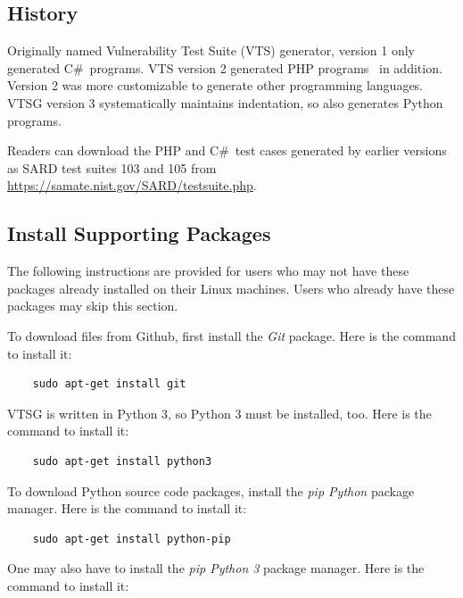 \documentclass[12pt]{article}
\newcommand{\CSharp}{C{\fontseries{b}\selectfont\#}}
\begin{document}
\subsection{History} 

Originally named Vulnerability Test Suite (VTS) generator, version 1 only
generated \CSharp\ programs. VTS version 2 generated PHP
programs~\cite{StivaletFongVTSPHP2016} in addition.  Version 2 was more
customizable to generate other programming languages.
VTSG version 3 systematically maintains indentation, so also
generates Python programs.

Readers can download the PHP and \CSharp\ test cases generated 
by earlier versions as SARD test suites 103 and 105 from
\href{https://samate.nist.gov/SARD/testsuite.php}{https://samate.nist.gov/SARD/testsuite.php}.


\subsection{Install Supporting Packages}

\noindent The following instructions are provided for users who may not have these
packages already installed on their Linux machines. Users who already have these
packages may skip this section.

\noindent To download files from Github, first install the \emph{Git} package.
Here is the command to install it:

\begin{verbatim}
    sudo apt-get install git    
\end{verbatim}

\noindent VTSG is written in Python 3, so Python 3 must be installed, too.
Here is the command to install it:

\begin{verbatim}
    sudo apt-get install python3
\end{verbatim}

\noindent To download Python source code packages, install the \emph{pip
Python} package manager.
Here is the command to install it:

\begin{verbatim}
    sudo apt-get install python-pip
\end{verbatim}

\noindent One may also have to install the \emph{pip Python 3} package manager.
Here is the command to install it:
\end{document}

